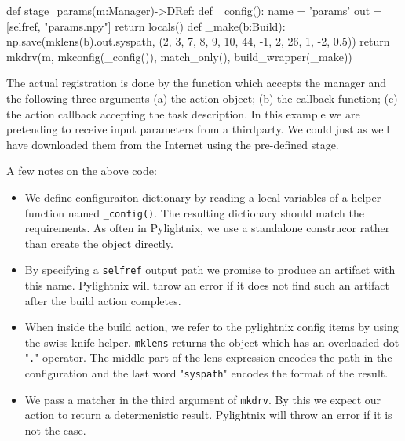 \begin{pythontexcode}
def stage_params(m:Manager)->DRef:
  def _config():
    name = 'params'
    out = [selfref, "params.npy"]
    return locals()
  def _make(b:Build):
    np.save(mklens(b).out.syspath, (2, 3, 7, 8, 9, 10, 44, -1, 2, 26, 1, -2, 0.5))
  return mkdrv(m, mkconfig(_config()), match_only(), build_wrapper(_make))
\end{pythontexcode}

The actual registration is done by the 
function which accepts the manager and the following three arguments (a) the
action  object; (b) the
 callback function; (c) the action
callback accepting the  task description. In
this example we are pretending to receive input parameters from a
thirdparty. We could just as well have downloaded them from the Internet using
the  pre-defined stage.

\hfill \break \noindent
A few notes on the above code:

\begin{itemize}
  \item We define configuraiton dictionary by reading a local variables of a
    helper function named \texttt{\_config()}. The resulting dictionary should
    match the  requirements. As often in
    Pylightnix, we use a standalone 
    construcor rather than create the object directly.
  \item By specifying a \texttt{selfref} output path we promise to produce an
    artifact with this name. Pylightnix will throw an error if it does not find
    such an artifact after the build action completes.
  \item When inside the build action, we refer to the pylightnix config items by
    using the  swiss knife helper.
    \texttt{mklens} returns the  object which
    has an overloaded dot "\texttt{.}" operator. The middle part of the lens
    expression encodes the path in the configuration and the last word
    "\texttt{syspath}" encodes the format of the result.
  \item We pass a  matcher in
    the third argument of \texttt{mkdrv}. By this we expect our action to return
    a determenistic result. Pylightnix will throw an error if it is not the
    case.
  \end{itemize}


